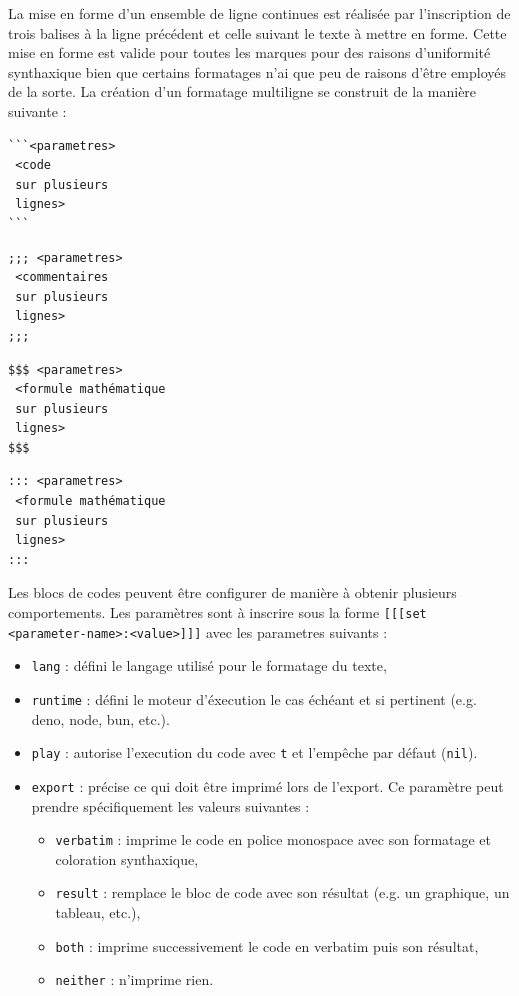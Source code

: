 \documentclass[a4paper,12pt]{article}
\begin{document}
La mise en forme d'un ensemble de ligne continues est réalisée par l'inscription de trois balises à la ligne précédent et celle suivant le texte à mettre en forme. Cette mise en forme est valide pour toutes les marques pour des raisons d'uniformité synthaxique bien que certains formatages n'ai que peu de raisons d'être employés de la sorte. La création d'un formatage multiligne se construit de la manière suivante :
\begin{multicols}{2}
\begin{verbatim}
```<parametres>
 <code
 sur plusieurs
 lignes>
```
\end{verbatim}

\begin{verbatim}
;;; <parametres>
 <commentaires
 sur plusieurs
 lignes>
;;;
\end{verbatim}

\begin{verbatim}
$$$ <parametres>
 <formule mathématique
 sur plusieurs
 lignes>
$$$
\end{verbatim}

\begin{verbatim}
::: <parametres>
 <formule mathématique
 sur plusieurs
 lignes>
:::
\end{verbatim}
\end{multicols}

Les blocs de codes peuvent être configurer de manière à obtenir plusieurs comportements. Les paramètres sont à inscrire sous la forme \texttt{[[[set <parameter-name>:<value>]]]} avec les parametres suivants :
\begin{itemize}
\item \texttt{lang} : défini le langage utilisé pour le formatage du texte,
\item \texttt{runtime} : défini le moteur d'éxecution le cas échéant et si pertinent (e.g. deno, node, bun, etc.).
\item \texttt{play} : autorise l'execution du code avec \texttt{t} et l'empêche par défaut (\texttt{nil}).
\item \texttt{export} : précise ce qui doit être imprimé lors de l'export. Ce paramètre peut prendre spécifiquement les valeurs suivantes :
\begin{itemize}
\item \texttt{verbatim} : imprime le code en police monospace avec son formatage et coloration synthaxique,
\item \texttt{result} : remplace le bloc de code avec son résultat (e.g. un graphique, un tableau, etc.),
\item \texttt{both} : imprime successivement le code en verbatim puis son résultat,
\item \texttt{neither} : n'imprime rien.
\end{itemize}
\end{itemize}
\end{document}
